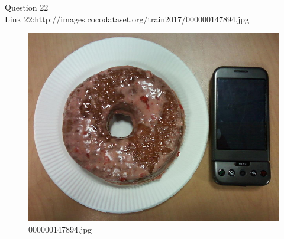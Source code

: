 Question 22\\
Link 22:http://images.cocodataset.org/train2017/000000147894.jpg
    \begin{figure}[h]
        \centering
        \includegraphics[width=0.8\linewidth]{../image set/easy/000000147894.jpg}
        \caption{000000147894.jpg}
    \end{figure}
